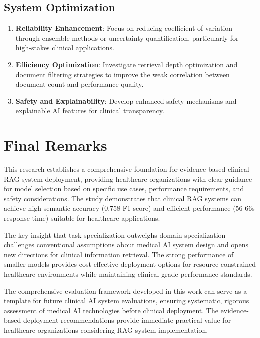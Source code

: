 \subsection{System Optimization}

\begin{enumerate}
    \item \textbf{Reliability Enhancement}: Focus on reducing coefficient of variation through ensemble methods or uncertainty quantification, particularly for high-stakes clinical applications.

    \item \textbf{Efficiency Optimization}: Investigate retrieval depth optimization and document filtering strategies to improve the weak correlation between document count and performance quality.

    \item \textbf{Safety and Explainability}: Develop enhanced safety mechanisms and explainable AI features for clinical transparency.
\end{enumerate}

\section{Final Remarks}

This research establishes a comprehensive foundation for evidence-based clinical RAG system deployment, providing healthcare organizations with clear guidance for model selection based on specific use cases, performance requirements, and safety considerations. The study demonstrates that clinical RAG systems can achieve high semantic accuracy (0.758 F1-score) and efficient performance (56-66s response time) suitable for healthcare applications.

The key insight that task specialization outweighs domain specialization challenges conventional assumptions about medical AI system design and opens new directions for clinical information retrieval. The strong performance of smaller models provides cost-effective deployment options for resource-constrained healthcare environments while maintaining clinical-grade performance standards.

The comprehensive evaluation framework developed in this work can serve as a template for future clinical AI system evaluations, ensuring systematic, rigorous assessment of medical AI technologies before clinical deployment. The evidence-based deployment recommendations provide immediate practical value for healthcare organizations considering RAG system implementation.

